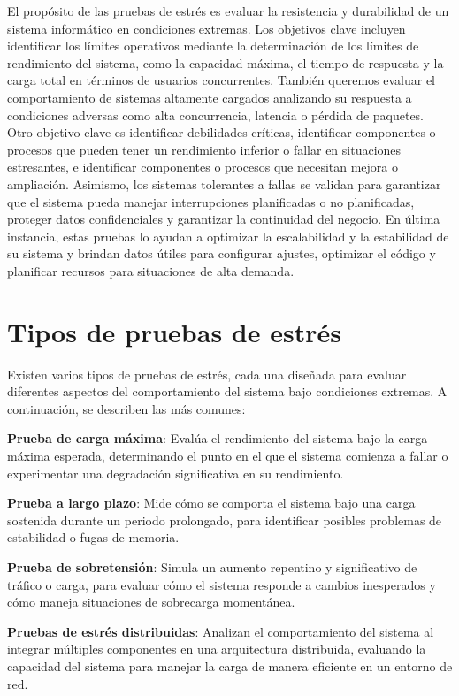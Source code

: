 \documentclass{article}
\begin{document}
El propósito de las pruebas de estrés es evaluar la resistencia y durabilidad de un sistema informático en condiciones extremas. Los objetivos clave incluyen identificar los límites operativos mediante la determinación de los límites de rendimiento del sistema, como la capacidad máxima, el tiempo de respuesta y la carga total en términos de usuarios concurrentes. También queremos evaluar el comportamiento de sistemas altamente cargados analizando su respuesta a condiciones adversas como alta concurrencia, latencia o pérdida de paquetes. Otro objetivo clave es identificar debilidades críticas, identificar componentes o procesos que pueden tener un rendimiento inferior o fallar en situaciones estresantes, e identificar componentes o procesos que necesitan mejora o ampliación. Asimismo, los sistemas tolerantes a fallas se validan para garantizar que el sistema pueda manejar interrupciones planificadas o no planificadas, proteger datos confidenciales y garantizar la continuidad del negocio. En última instancia, estas pruebas lo ayudan a optimizar la escalabilidad y la estabilidad de su sistema y brindan datos útiles para configurar ajustes, optimizar el código y planificar recursos para situaciones de alta demanda.

\section{Tipos de pruebas de estrés} 

Existen varios tipos de pruebas de estrés, cada una diseñada para evaluar diferentes aspectos del comportamiento del sistema bajo condiciones extremas. A continuación, se describen las más comunes:

\textbf{Prueba de carga máxima}: Evalúa el rendimiento del sistema bajo la carga máxima esperada, determinando el punto en el que el sistema comienza a fallar o experimentar una degradación significativa en su rendimiento.

\textbf{Prueba a largo plazo}: Mide cómo se comporta el sistema bajo una carga sostenida durante un periodo prolongado, para identificar posibles problemas de estabilidad o fugas de memoria.

\textbf{Prueba de sobretensión}: Simula un aumento repentino y significativo de tráfico o carga, para evaluar cómo el sistema responde a cambios inesperados y cómo maneja situaciones de sobrecarga momentánea.

\textbf{Pruebas de estrés distribuidas}: Analizan el comportamiento del sistema al integrar múltiples componentes en una arquitectura distribuida, evaluando la capacidad del sistema para manejar la carga de manera eficiente en un entorno de red.
\end{document}
